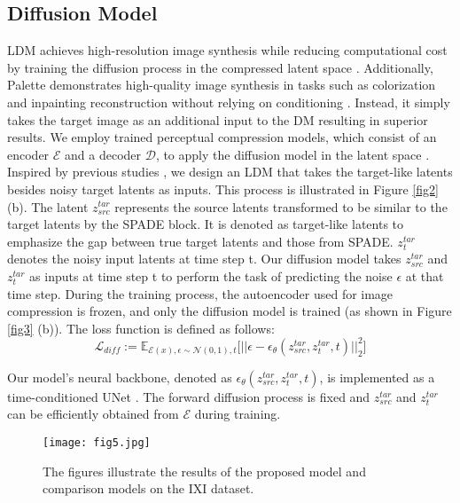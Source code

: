 \documentclass[10pt,twocolumn,letterpaper]{article}
\begin{document}
\subsection{Diffusion Model}
LDM achieves high-resolution image synthesis while reducing computational cost by training the diffusion process in the compressed latent space \cite{rombach2022high}. Additionally, Palette demonstrates high-quality image synthesis in tasks such as colorization and inpainting reconstruction without relying on conditioning \cite{saharia2022palette}. Instead, it simply takes the target image as an additional input to the DM resulting in superior results. We employ trained perceptual compression models, which consist of an encoder $\mathcal{E}$ and a decoder $\mathcal{D}$, to apply the diffusion model in the latent space \cite{rombach2022high}. Inspired by previous studies \cite{rombach2022high, saharia2022palette}, we design an LDM that takes the target-like latents  besides noisy target latents as inputs. This process is illustrated in Figure \ref{fig2} (b). The latent $z^{tar}_{src}$ represents the source latents transformed to be similar to the target latents by the SPADE block. It is denoted as target-like latents to emphasize the gap between true target latents and those from SPADE. $z^{tar}_t$ denotes the noisy input latents at time step t. Our diffusion model takes $z^{tar}_{src}$ and $z^{tar}_t$ as inputs at time step t to perform the task of predicting the noise $\epsilon$ at that time step. During the training process, the autoencoder used for image compression is frozen, and only the diffusion model is trained (as shown in Figure \ref{fig3} (b)). The loss function is defined as follows:
\begin{equation}  \label{eq:2}
\mathcal{L}_{diff} := \mathbb{E}_{\mathcal{E}(x), \epsilon \sim \mathcal{N}(0,1), t} \Big[ || \epsilon-\epsilon_\theta(z^{tar}_{src}, z^{tar}_t,t)||^2_2 \Big]
\end{equation}

\noindent Our model's neural backbone, denoted as $\epsilon_{\theta}(z_{src}^{tar}, z_{t}^{tar}, t)$, is implemented as a time-conditioned UNet \cite{ho2020denoising ,rombach2022high}. The forward diffusion process is fixed and $z_{src}^{tar}$ and $z_t^{tar}$ can be efficiently obtained from $\mathcal{E}$ during training.

\begin{figure*} [ht]
    \centerline{\texttt{[image: fig5.jpg]}}
    \caption{The figures illustrate the results of the proposed model and comparison models on the IXI dataset.}
    \label{fig5}
    \vspace{-3pt}
\end{figure*}
\end{document}
